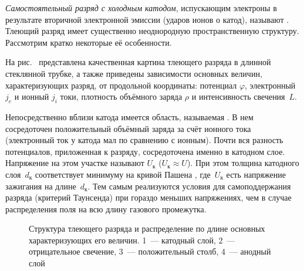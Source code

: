\emph{Самостоятельный разряд с холодным катодом}, испускающим электроны
в результате вторичной электронной эмиссии 
(ударов ионов о катод), называют .
Тлеющий разряд имеет существенно неоднородную пространственную структуру. 
Рассмотрим кратко некоторые её особенности.

На рис.~ представлена качественная картина тлеющего
разряда в длинной стеклянной трубке, а также приведены зависимости
основных величин, характеризующих разряд, от продольной координаты:
потенциал $\varphi$, электронный $j_e$ и ионный $j_i$ токи,
плотность объёмного заряда $\rho$ и интенсивность свечения~$L$.

Непосредственно вблизи катода имеется область, называемая .
В нем сосредоточен положительный объёмный заряда за счёт
ионного тока (электронный ток у катода мал по сравнению с ионным).
Почти вся разность потенциалов, приложенная к разряду, 
сосредоточена именно в катодном слое.
Напряжение на этом участке называют
 $U_{к}$ ($U_{к} \approx U$).
При этом толщина катодного слоя~$d_{к}$ соответствует минимуму на кривой
Пашена , где~$U_{к}$ есть напряжение зажигания
на длине~$d_{к}$. Тем самым реализуются условия для самоподдержания разряда
(критерий Таунсенда) при гораздо меньших напряжениях, 
чем в случае распределения поля на всю длину газового промежутка.




\begin{figure}[h!]
	\centering
	\caption{Структура тлеющего разряда и распределение по длине основных 
        характеризующих его величин. 
        1~--- катодный слой,
        2~--- отрицательное свечение,
        3~--- положительный столб,
        4~--- анодный слой
        }
\end{figure}

